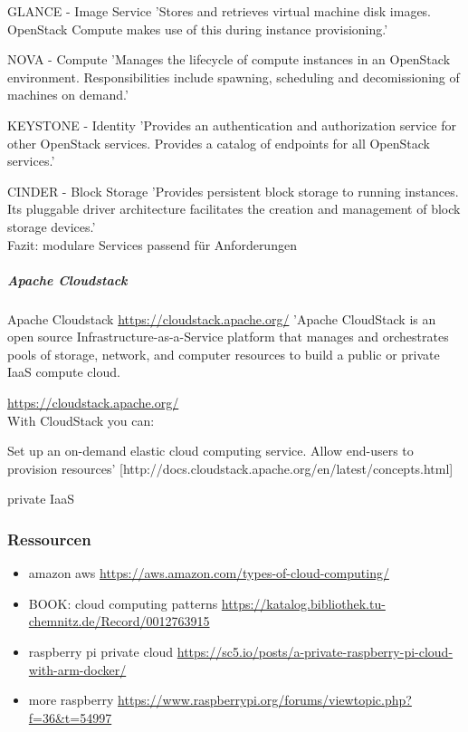 \documentclass[a4paper,10pt]{article}
\begin{document}
GLANCE - Image Service
'Stores and retrieves virtual machine disk images. OpenStack Compute makes use of this during instance provisioning.'

NOVA - Compute
'Manages the lifecycle of compute instances in an OpenStack environment. Responsibilities include spawning, scheduling and decomissioning of machines on demand.'

KEYSTONE - Identity
'Provides an authentication and authorization service for other OpenStack services. Provides a catalog of endpoints for all OpenStack services.'

CINDER - Block Storage
'Provides persistent block storage to running instances. Its pluggable driver architecture facilitates the creation and management of block storage devices.'\\

Fazit:
modulare Services
passend für Anforderungen

\subparagraph{Apache Cloudstack}

\begin{boxed}{Apache Cloudstack \url{https://cloudstack.apache.org/}}
'Apache CloudStack is an open source Infrastructure-as-a-Service platform that manages and orchestrates pools of storage, network, and computer resources to build a public or private IaaS compute cloud.
\end{boxed}

\url{https://cloudstack.apache.org/}\\

With CloudStack you can:

Set up an on-demand elastic cloud computing service.
Allow end-users to provision resources' [http://docs.cloudstack.apache.org/en/latest/concepts.html]

private
IaaS

\subsubsection{Ressourcen}

\begin{itemize}
 \item amazon aws \url{https://aws.amazon.com/types-of-cloud-computing/}
 \item BOOK: cloud computing patterns \url{https://katalog.bibliothek.tu-chemnitz.de/Record/0012763915}
 \item raspberry pi private cloud \url{https://sc5.io/posts/a-private-raspberry-pi-cloud-with-arm-docker/}
 \item more raspberry \url{https://www.raspberrypi.org/forums/viewtopic.php?f=36&t=54997}
\end{itemize}
\end{document}
